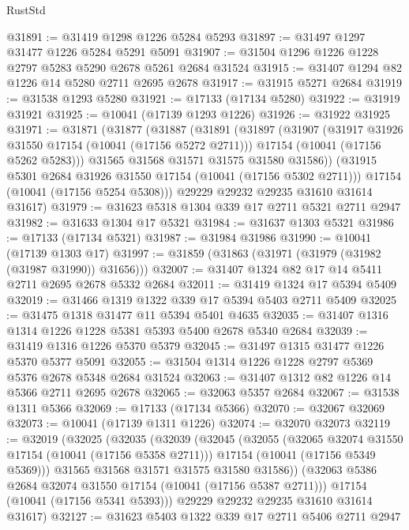 \begin{lexlean}{RustStd}
\begin{coremodule}
@31891 := @31419 @1298 @1226 @5284 @5293
@31897 := @31497 @1297 @31477 @1226 @5284 @5291 @5091
@31907 := @31504 @1296 @1226 @1228 @2797 @5283 @5290 @2678 @5261 @2684 @31524
@31915 := @31407 @1294 @82 @1226 @14 @5280 @2711 @2695 @2678
@31917 := @31915 @5271 @2684
@31919 := @31538 @1293 @5280
@31921 := @17133 (@17134 @5280)
@31922 := @31919 @31921
@31925 := @10041 (@17139 @1293 @1226)
@31926 := @31922 @31925
@31971 := @31871
    (@31877
      (@31887
        (@31891
          (@31897
            (@31907
              (@31917 @31926 @31550 @17154 (@10041 (@17156 @5272 @2711)))
              @17154
              (@10041 (@17156 @5262 @5283)))
            @31565
            @31568
            @31571
            @31575
            @31580
            @31586))
        (@31915 @5301 @2684 @31926 @31550 @17154 (@10041 (@17156 @5302 @2711)))
        @17154
        (@10041 (@17156 @5254 @5308)))
      @29229
      @29232
      @29235
      @31610
      @31614
      @31617)
@31979 := @31623 @5318 @1304 @339 @17 @2711 @5321 @2711 @2947
@31982 := @31633 @1304 @17 @5321
@31984 := @31637 @1303 @5321
@31986 := @17133 (@17134 @5321)
@31987 := @31984 @31986
@31990 := @10041 (@17139 @1303 @17)
@31997 := @31859 (@31863 (@31971 (@31979 (@31982 (@31987 @31990)) @31656)))
@32007 := @31407 @1324 @82 @17 @14 @5411 @2711 @2695 @2678 @5332 @2684
@32011 := @31419 @1324 @17 @5394 @5409
@32019 := @31466 @1319 @1322 @339 @17 @5394 @5403 @2711 @5409
@32025 := @31475 @1318 @31477 @11 @5394 @5401 @4635
@32035 := @31407 @1316 @1314 @1226 @1228 @5381 @5393 @5400 @2678 @5340 @2684
@32039 := @31419 @1316 @1226 @5370 @5379
@32045 := @31497 @1315 @31477 @1226 @5370 @5377 @5091
@32055 := @31504 @1314 @1226 @1228 @2797 @5369 @5376 @2678 @5348 @2684 @31524
@32063 := @31407 @1312 @82 @1226 @14 @5366 @2711 @2695 @2678
@32065 := @32063 @5357 @2684
@32067 := @31538 @1311 @5366
@32069 := @17133 (@17134 @5366)
@32070 := @32067 @32069
@32073 := @10041 (@17139 @1311 @1226)
@32074 := @32070 @32073
@32119 := @32019
    (@32025
      (@32035
        (@32039
          (@32045
            (@32055
              (@32065 @32074 @31550 @17154 (@10041 (@17156 @5358 @2711)))
              @17154
              (@10041 (@17156 @5349 @5369)))
            @31565
            @31568
            @31571
            @31575
            @31580
            @31586))
        (@32063 @5386 @2684 @32074 @31550 @17154 (@10041 (@17156 @5387 @2711)))
        @17154
        (@10041 (@17156 @5341 @5393)))
      @29229
      @29232
      @29235
      @31610
      @31614
      @31617)
@32127 := @31623 @5403 @1322 @339 @17 @2711 @5406 @2711 @2947

\end{coremodule}
\end{lexlean}
